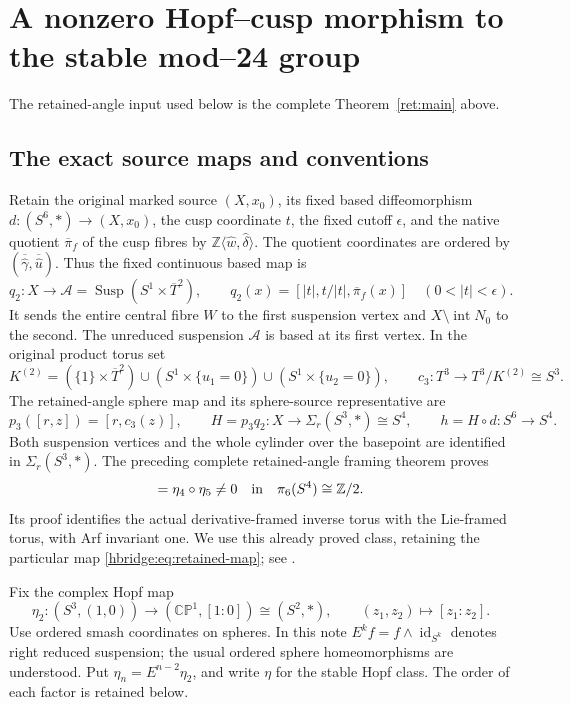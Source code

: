 \documentclass[11pt,letterpaper]{article}
\numberwithin{equation}{section}
\theoremstyle{definition}
\theoremstyle{remark}
\begin{document}
\section{A nonzero Hopf--cusp morphism to the stable mod--24 group}
\label{hbridge:section}
The retained-angle input used below is the complete Theorem~\ref{ret:main} above.

\subsection{The exact source maps and conventions}

Retain the original marked source \((X,x_0)\), its fixed based
diffeomorphism \(d:(S^6,*)\to(X,x_0)\), the cusp coordinate \(t\),
the fixed cutoff \(\epsilon\), and the native quotient
\(\overline\pi_f\) of the cusp fibres by
\(\mathbb Z\langle\widehat w,\widehat\delta\rangle\).
The quotient coordinates are ordered by
\((\overline{\widehat\gamma},\overline{\widehat u})\).
Thus the fixed continuous based map is
\[
q_2:X\longrightarrow
\mathcal A=\operatorname{Susp}(S^1\times\overline T^2),
\qquad
q_2(x)=[|t|,t/|t|,\overline\pi_f(x)]
\quad(0<|t|<\epsilon).
\]
It sends the entire central fibre \(W\) to the first suspension
vertex and \(X\setminus\operatorname{int}N_0\) to the second.
The unreduced suspension \(\mathcal A\) is based at its first
vertex. In the original product torus set
\[
K^{(2)}=(\{1\}\times\overline T^2)
\cup(S^1\times\{u_1=0\})
\cup(S^1\times\{u_2=0\}),
\qquad c_3:T^3\longrightarrow T^3/K^{(2)}\cong S^3.
\]
The retained-angle sphere map and its sphere-source representative are
\begin{equation}
p_3([r,z])=[r,c_3(z)],\qquad
H=p_3q_2:X\longrightarrow\Sigma_r(S^3,*)\cong S^4,
\qquad h=H\circ d:S^6\longrightarrow S^4.
\label{hbridge:eq:retained-map}
\end{equation}
Both suspension vertices and the whole cylinder over the basepoint
are identified in \(\Sigma_r(S^3,*)\). The preceding complete
retained-angle framing theorem proves
\begin{equation}
[h]=\eta_4\circ\eta_5\ne0
\quad\hbox{in}\quad\pi_6(S^4)\cong\mathbb Z/2.
\label{hbridge:eq:proved-H}
\end{equation}
Its proof identifies the actual derivative-framed inverse torus
with the Lie-framed torus, with Arf invariant one. We use this
already proved class, retaining the particular map
\eqref{hbridge:eq:retained-map}; see \cite{hbridgebib:HBRetained}.

Fix the complex Hopf map
\[
\eta_2:(S^3,(1,0))\longrightarrow
(\mathbb{CP}^1,[1:0])\cong(S^2,*),\qquad
(z_1,z_2)\longmapsto[z_1:z_2].
\]
Use ordered smash coordinates on spheres. In this note
\(E^k f=f\wedge\operatorname{id}_{S^k}\) denotes right reduced
suspension; the usual ordered sphere homeomorphisms are understood.
Put \(\eta_n=E^{n-2}\eta_2\), and write \(\eta\) for the
stable Hopf class. The order of each factor is retained below.
\end{document}
